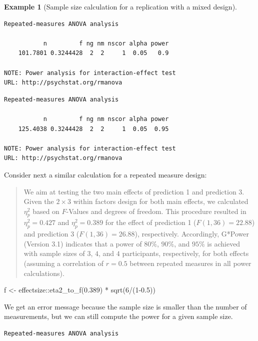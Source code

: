 \documentclass[
  11pt,
  letterpaper,
]{scrbook}
\newenvironment{Shaded}{\begin{snugshade}}{\end{snugshade}}
\newcommand{\DecValTok}[1]{\textcolor[rgb]{0.68,0.00,0.00}{#1}}
\newcommand{\FloatTok}[1]{\textcolor[rgb]{0.68,0.00,0.00}{#1}}
\newcommand{\FunctionTok}[1]{\textcolor[rgb]{0.28,0.35,0.67}{#1}}
\newcommand{\NormalTok}[1]{\textcolor[rgb]{0.00,0.23,0.31}{#1}}
\newcommand{\OtherTok}[1]{\textcolor[rgb]{0.00,0.23,0.31}{#1}}
\newcommand{\SpecialCharTok}[1]{\textcolor[rgb]{0.37,0.37,0.37}{#1}}
\theoremstyle{definition}
\newtheorem{example}{Example}[chapter]
\theoremstyle{definition}
\theoremstyle{remark}
\begin{document}
\begin{example}[Sample size calculation for a replication with a mixed
design]
\begin{verbatim}
Repeated-measures ANOVA analysis

           n         f ng nm nscor alpha power
    101.7801 0.3244428  2  2     1  0.05   0.9

NOTE: Power analysis for interaction-effect test
URL: http://psychstat.org/rmanova
\end{verbatim}

\begin{verbatim}
Repeated-measures ANOVA analysis

           n         f ng nm nscor alpha power
    125.4038 0.3244428  2  2     1  0.05  0.95

NOTE: Power analysis for interaction-effect test
URL: http://psychstat.org/rmanova
\end{verbatim}

Consider next a similar calculation for a repeated measure design:

\begin{quote}
We aim at testing the two main effects of prediction 1 and prediction 3.
Given the \(2 \times 3\) within factors design for both main effects, we
calculated \(\eta^2_p\) based on \(F\)-Values and degrees of freedom.
This procedure resulted in \(\eta^2_p=0.427\) and \(\eta^2_p=0.389\) for
the effect of prediction 1 (\(F(1, 36)=22.88\)) and prediction 3
(\(F(1, 36)=26.88\)), respectively. Accordingly, G*Power (Version 3.1)
indicates that a power of \(80\)\%, \(90\)\%, and \(95\)\% is achieved
with sample sizes of \(3\), \(4\), and \(4\) participants, respectively,
for both effects (assuming a correlation of \(r=0.5\) between repeated
measures in all power calculations).
\end{quote}

\begin{Shaded}
\begin{Highlighting}[]
\NormalTok{f }\OtherTok{\textless{}{-}}\NormalTok{ effectsize}\SpecialCharTok{::}\FunctionTok{eta2\_to\_f}\NormalTok{(}\FloatTok{0.389}\NormalTok{) }\SpecialCharTok{*} \FunctionTok{sqrt}\NormalTok{(}\DecValTok{6}\SpecialCharTok{/}\NormalTok{(}\DecValTok{1}\FloatTok{{-}0.5}\NormalTok{))}
\end{Highlighting}
\end{Shaded}

We get an error message because the sample size is smaller than the
number of measurements, but we can still compute the power for a given
sample size.

\begin{verbatim}
Repeated-measures ANOVA analysis


\end{verbatim}
\end{example}
\end{document}
